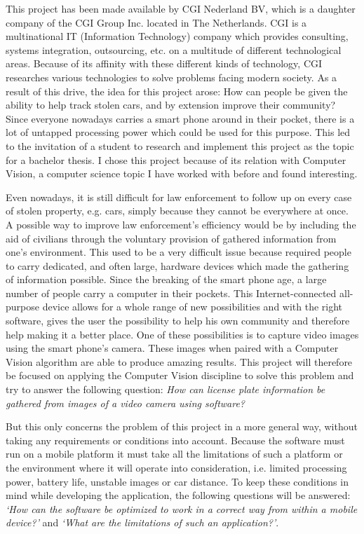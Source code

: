 

This project has been made available by CGI Nederland BV, which is a daughter company of the CGI Group Inc. located in The Netherlands. CGI is a multinational IT (Information Technology) company which provides consulting, systems integration, outsourcing, etc. on a multitude of different technological areas. Because of its affinity with these different kinds of technology, CGI researches various technologies to solve problems facing modern society. As a result of this drive, the idea for this project arose: How can people be given the ability to help track stolen cars, and by extension improve their community? Since everyone nowadays carries a smart phone around in their pocket, there is a lot of untapped processing power which could be used for this purpose. This led to the invitation of a student to research and implement this project as the topic for a bachelor thesis. I chose this project because of its relation with Computer Vision, a computer science topic I have worked with before and found interesting.


Even nowadays, it is still difficult for law enforcement to follow up on every case of stolen property, e.g. cars, simply because they cannot be everywhere at once. A possible way to improve law enforcement's efficiency would be by including the aid of civilians through the voluntary provision of gathered information from one's environment. This used to be a very difficult issue because required people to carry dedicated, and often large, hardware devices which made the gathering of information possible. Since the breaking of the smart phone age, a large number of people carry a computer in their pockets. This Internet-connected all-purpose device allows for a whole range of new possibilities and with the right software, gives the user the possibility to help his own community and therefore help making it a better place. One of these possibilities is to capture video images using the smart phone's camera. These images when paired with a Computer Vision algorithm are able to produce amazing results. This project will therefore be focused on applying the Computer Vision discipline to solve this problem and try to answer the following question: \textit{How can license plate information be gathered from images of a video camera using software?}

But this only concerns the problem of this project in a more general way, without taking any requirements or conditions into account. Because the software must run on a mobile platform it must take all the limitations of such a platform or the environment where it will operate into consideration, i.e. limited processing power, battery life, unstable images or car distance. To keep these conditions in mind while developing the application, the following questions will be answered: \textit{`How can the software be optimized to work in a correct way from within a mobile device?'} and \textit{`What are the limitations of such an application?'}.

